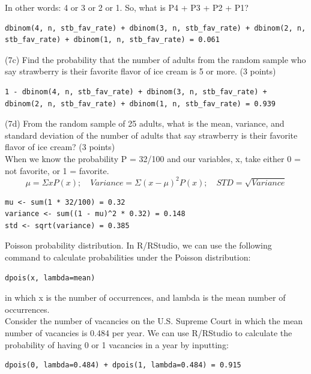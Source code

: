 \documentclass{article}
\begin{document}
In other words: 4 or 3 or 2 or 1. So, what is P4 + P3 + P2 + P1?
\begin{center}
\begin{lstlisting}
dbinom(4, n, stb_fav_rate) + dbinom(3, n, stb_fav_rate) + dbinom(2, n, stb_fav_rate) + dbinom(1, n, stb_fav_rate) = 0.061
\end{lstlisting}
\end{center}

(7c) Find the probability that the number of adults from the random sample who say strawberry is their favorite flavor of ice cream is 5 or more. (3 points)
\begin{center}
\begin{lstlisting}
1 - dbinom(4, n, stb_fav_rate) + dbinom(3, n, stb_fav_rate) + dbinom(2, n, stb_fav_rate) + dbinom(1, n, stb_fav_rate) = 0.939
\end{lstlisting}
\end{center}
(7d) From the random sample of 25 adults, what is the mean, variance, and standard deviation of the number of adults that say strawberry is their favorite flavor of ice cream? (3 points)\\

When we know the probability P = 32/100 and our variables, x, take either 0 = not favorite, or 1 = favorite. 
\[
\mu = \Sigma x P\left( x \right); \quad Variance = \Sigma \left( x - \mu \right)^{2} P \left( x \right); \quad STD = \sqrt{Variance}
\]

\begin{center}
\begin{lstlisting}
mu <- sum(1 * 32/100) = 0.32
variance <- sum((1 - mu)^2 * 0.32) = 0.148
std <- sqrt(variance) = 0.385
\end{lstlisting}
\end{center}


 

Poisson probability distribution. In R/RStudio, we can use the following command to calculate probabilities under the Poisson distribution:
\begin{center}
\begin{lstlisting}
dpois(x, lambda=mean)
\end{lstlisting}
\end{center}

in which x is the number of occurrences, and lambda is the mean number of occurrences.\\

Consider the number of vacancies on the U.S. Supreme Court in which the mean number of vacancies is 0.484 per year. We can use R/RStudio to calculate the probability of having 0 or 1 vacancies in a year by inputting:
\begin{center}
\begin{lstlisting}
dpois(0, lambda=0.484) + dpois(1, lambda=0.484) = 0.915
\end{lstlisting}
\end{center}
\end{document}
